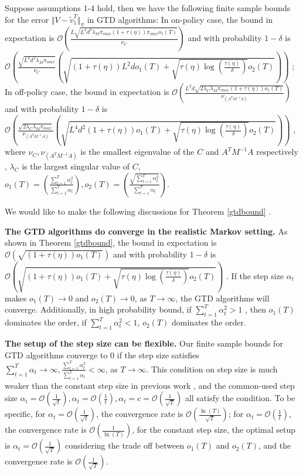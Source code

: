 \documentclass[twoside,11pt]{article}
\numberwithin{equation}{section}
\begin{document}
	\begin{theorem}\label{gtdbound} 
		Suppose assumptions 1-4 hold, then we have the following finite sample bounds for the   error $ \Vert V- \tilde{v}_1^T \Vert_\pi $ in GTD algorithms: In on-policy case, the  bound  in expectation is  $\mathcal{O} \left(\frac{L \sqrt{L^4 d^3 \lambda_M\pi_{max} (1+\tau(\eta))\pi_{max}o_1(T)}}{\nu_C}\right)$  and with probability $ 1-\delta $ is  $\mathcal{O}\left(\frac{\sqrt{  L^4 d^2 \lambda_M\pi_{max} }}{\nu_C} \left( \sqrt{(1+\tau(\eta))L^2 d o_1(T) + \sqrt{\tau(\eta)\log\left(\frac{\tau(\eta)}{\delta} \right)}o_2(T)} \right) \right)$ ;		
		In off-policy case, the  bound in expectation is  $\mathcal{O} \left(\frac{L^2d\sqrt{2\lambda_C\lambda_M\pi_{max} (1+\tau(\eta))o_1(T)}}{\nu_{(A^TM^{-1}A)}}\right)$  and with probability $ 1-\delta $ is  $\mathcal{O} \left(\frac{\sqrt{2\lambda_C\lambda_M\pi_{max} }}{\nu_{(A^TM^{-1}A)}}  \left( \sqrt{L^4d^2(1+\tau(\eta))o_1(T) + \sqrt{\tau(\eta)\log{(\frac{\tau(\eta)}{\delta})}}o_2(T) } \right) \right)$ , 
		where $ \nu_C, \nu_{(A^TM^{-1}A)}$ is the smallest eigenvalue of the $C$ and $ A^TM^{-1}A $ respectively , $\lambda_C$ is the largest singular value of $C$, $ o_1(T) =   (\frac{\sum_{t=1}^{T}\alpha_t^2}{\sum_{t=1}^{T}\alpha_t}) , o_2(T) =   (\frac{\sqrt{\sum_{t=1}^{T}\alpha_t^2}}{\sum_{t=1}^{T}\alpha_t}) $. 		
		
	\end{theorem}
	
	We would like to make the following discussions for   Theorem \ref{gtdbound} .	
	
	\textbf{The GTD algorithms do converge in the realistic Markov setting. } As shown in Theorem \ref{gtdbound}, the  bound  in expectation is   $ \mathcal{O}\left( \sqrt{(1+\tau(\eta))o_1(T)} \right) $ and with   probability $ 1-\delta $ is   $ \mathcal{O}\left( \sqrt{(1+\tau(\eta))o_1(T) + \sqrt{\tau(\eta)\log(\frac{\tau(\eta)}{\delta}) } o_2(T)}   \right)  $   . If the step size $\alpha_t$ makes $o_1(T)\to 0$ and $o_2(T)\to 0$, as $T\to \infty$, the GTD algorithms will converge. Additionally, in high probability bound, if $ \sum_{t=1}^{T}\alpha_t^2 > 1 $ , then $ o_1(T) $   dominates the order, if $ \sum_{t=1}^{T}\alpha_t^2 < 1 $, $o_2(T)$ dominates the order.
	
	\textbf{The setup of the step size can be flexible.} Our finite sample bounds for GTD algorithms converge to $0$ if the step size satisfies $\sum_{t=1}^{T}\alpha_t \to \infty, \frac{\sum_{t=1}^{T}\alpha_t^2}{\sum_{t=1}^{T}\alpha_t} <\infty $, as $T\to \infty$. This condition on step size is much weaker than the constant step size in previous work \cite{liu2015finite} , and the common-used step size $\alpha_t =  \mathcal{O}(\frac{1}{\sqrt{t}}), \alpha_t =\mathcal{O}(\frac{1}{t}),\alpha_t =c = \mathcal{O}(\frac{1}{\sqrt{T}} ) $  all satisfy the condition. To be specific, for $ \alpha_t = \mathcal{O}(\frac{1}{\sqrt{t}})  $, the convergence rate is $\mathcal{O}(\frac{\ln(T)}{\sqrt{T}})$; for $ \alpha_t = \mathcal{O}(\frac{1}{t}) $, the convergence rate is $ \mathcal{O}(\frac{1}{\ln(T)})$, for the constant step size, the optimal setup is $ \alpha_t =\mathcal{O}( \frac{1}{\sqrt{T}} ) $ considering the trade off between  $ o_1(T) $ and $ o_2(T) $, and the convergence rate is $ \mathcal{O}(\frac{1}{\sqrt{T}}) $.
	
\end{document}
